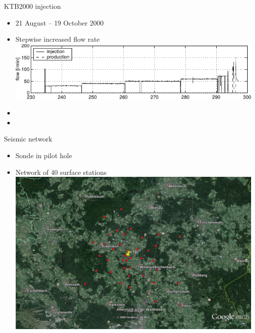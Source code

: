 \documentclass[14pt]{beamer}
\begin{document}
\begin{frame}{KTB2000 injection}
 \begin{itemize}
  \item 21 August -- 19 October 2000 
    \pause
  \item Stepwise increased flow rate
   \\ \includegraphics[scale=0.87]{img/KTB2000_flowrate.pdf}
  \item<4->
  \item<3->
 \end{itemize}
\end{frame}

\begin{frame}{Seismic network}
 \begin{itemize}
  \item Sonde in pilot hole
    \pause
  \item Network of 40 surface stations
    \pause
   \\ \includegraphics[scale=0.34]{img/SeismicNet-GE.png}
 \end{itemize}
\end{frame}
\end{document}
